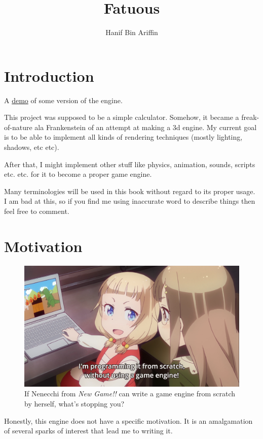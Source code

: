 \documentclass[a4paper,14pt]{extbook}
\title{Fatuous}
\author{Hanif Bin Ariffin}
\begin{document}
\maketitle
\tableofcontents

\newpage
\section{Introduction}

A \href{https://www.youtube.com/watch?v=BbLW4ZJnaLM}{demo} of some version of the engine.

This project was supposed to be a simple calculator.
Somehow, it became a freak-of-nature ala Frankenstein of an attempt at making a 3d engine.
My current goal is to be able to implement all kinds of rendering techniques (mostly lighting, shadows, etc etc).

After that, I might implement other stuff like physics, animation, sounds, scripts etc. etc. for it to become a proper game engine.

Many terminologies will be used in this book without regard to its proper usage.
I am bad at this, so if you find me using inaccurate word to describe things then feel free to comment.

\newpage
\section{Motivation}

\begin{figure}[h]
    \includegraphics[width=\textwidth]{.images/nenechi_writes_game_engine.png}
    \caption{If Nenecchi from \textit{New Game!!} can write a game engine from scratch by herself, what's stopping you?}
\end{figure}

Honestly, this engine does not have a specific motivation.
It is an amalgamation of several sparks of interest that lead me to writing it.
\end{document}
